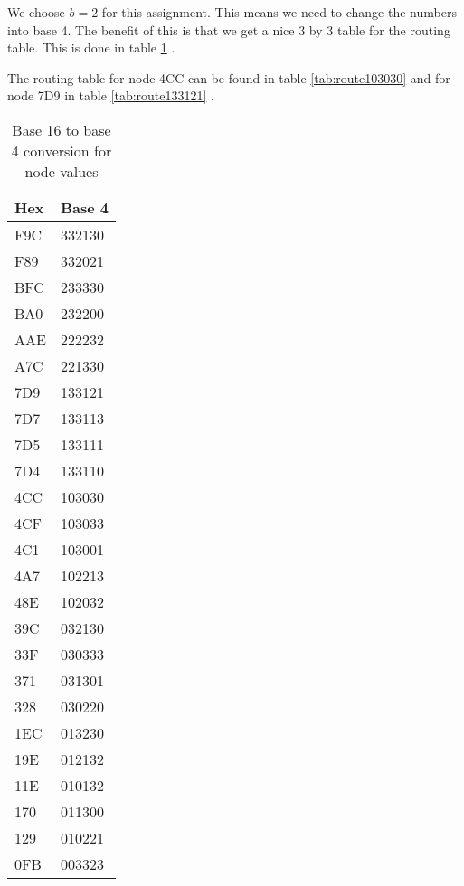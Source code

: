 \documentclass{article}
\begin{document}
We choose $b = 2$ for this assignment. This means we need to change the numbers into base 4. The benefit of this is that we get a nice 3 by 3 table for the routing table. This is done in table \ref{tab:b16b4conv} .

The routing table for node 4CC can be found in table \ref{tab:route103030} and for node 7D9 in table \ref{tab:route133121} .

\begin{table}[ht!]
    \begin{center}
    \begin{tabular}{| l | l |}
    \hline
    \bf{Hex}  & \bf{Base 4} \\
    \hline
    F9C         & 332130 \\
    \hline
    F89         & 332021 \\
    \hline
    BFC         & 233330 \\
    \hline
    BA0         & 232200 \\
    \hline
    AAE         & 222232 \\
    \hline
    A7C         & 221330 \\
    \hline
    7D9         & 133121 \\
    \hline
    7D7         & 133113 \\
    \hline
    7D5         & 133111 \\
    \hline
    7D4         & 133110 \\
    \hline
    4CC         & 103030 \\
    \hline
    4CF         & 103033 \\
    \hline
    4C1         & 103001 \\
    \hline
    4A7         & 102213 \\
    \hline
    48E         & 102032 \\
    \hline
    39C         & 032130 \\
    \hline
    33F         & 030333 \\
    \hline
    371         & 031301 \\
    \hline
    328         & 030220 \\
    \hline
    1EC         & 013230 \\
    \hline
    19E         & 012132 \\
    \hline
    11E         & 010132 \\
    \hline
    170         & 011300 \\
    \hline
    129         & 010221 \\
    \hline
    0FB         & 003323 \\
    \hline
    \end{tabular}
    \caption{Base 16 to base 4 conversion for node values}
    \label{tab:b16b4conv}
    \end{center}
\end{table}
\end{document}
